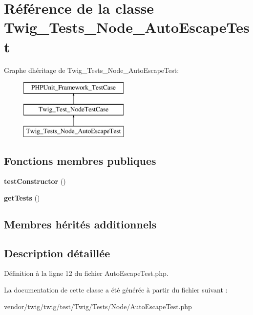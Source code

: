 \hypertarget{class_twig___tests___node___auto_escape_test}{}\section{Référence de la classe Twig\+\_\+\+Tests\+\_\+\+Node\+\_\+\+Auto\+Escape\+Test}
\label{class_twig___tests___node___auto_escape_test}
Graphe d\textquotesingle{}héritage de Twig\+\_\+\+Tests\+\_\+\+Node\+\_\+\+Auto\+Escape\+Test\+:\begin{figure}[H]
\begin{center}
\leavevmode
\includegraphics[height=3.000000cm]{class_twig___tests___node___auto_escape_test}
\end{center}
\end{figure}
\subsection*{Fonctions membres publiques}
\begin{DoxyCompactItemize}
\item 
{\bfseries test\+Constructor} ()\hypertarget{class_twig___tests___node___auto_escape_test_a47094dc941e72950570900d1418f89c6}{}\label{class_twig___tests___node___auto_escape_test_a47094dc941e72950570900d1418f89c6}

\item 
{\bfseries get\+Tests} ()\hypertarget{class_twig___tests___node___auto_escape_test_a7e247dd31cc8d37a6c97353a062a0080}{}\label{class_twig___tests___node___auto_escape_test_a7e247dd31cc8d37a6c97353a062a0080}

\end{DoxyCompactItemize}
\subsection*{Membres hérités additionnels}


\subsection{Description détaillée}


Définition à la ligne 12 du fichier Auto\+Escape\+Test.\+php.



La documentation de cette classe a été générée à partir du fichier suivant \+:\begin{DoxyCompactItemize}
\item 
vendor/twig/twig/test/\+Twig/\+Tests/\+Node/Auto\+Escape\+Test.\+php\end{DoxyCompactItemize}
